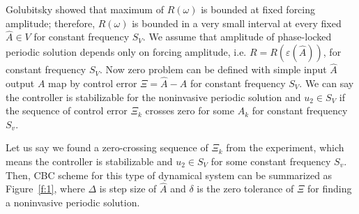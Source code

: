 \documentclass[openacc]{rsproca_new}%
\def\epsilon{\varepsilon}
\newcommand{\Fref}[1]{Figure~\ref{#1}}
\begin{document}
\noindent Golubitsky \cite{golubitsky2009feed} showed that maximum of $R(\omega)$ is bounded at fixed forcing amplitude; therefore, $R(\omega)$ is bounded in a very small interval at every fixed $\hat A \in V$ for constant frequency $S_V$. We assume that amplitude of phase-locked periodic solution depends only on forcing amplitude, i.e. $R=R(\epsilon(\hat A))$, for constant frequency $S_V$. Now zero problem can be defined with simple input $\hat A$ output $A$ map by control error $\Xi=\hat A - A$ for constant frequency $S_V$. We can say the controller is stabilizable for the noninvasive periodic solution and $u_2 \in S_V$ if the sequence of control error $\Xi_k$ crosses zero for some $A_k$ for constant frequency $S_v$.

Let us say we found a zero-crossing sequence of $\Xi_k$ from the experiment, which means the controller is stabilizable and $u_2 \in S_V$ for some constant frequency $S_v$. Then, CBC scheme for this type of dynamical system can be summarized as \Fref{f:1}, where $\Delta$ is step size of $\hat A$ and $\delta$ is the zero tolerance of $\Xi$ for finding a noninvasive periodic solution.
\end{document}
